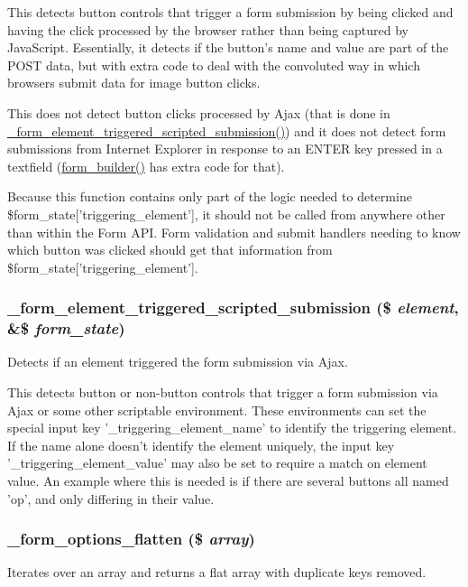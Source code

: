 This detects button controls that trigger a form submission by being clicked and having the click processed by the browser rather than being captured by JavaScript. Essentially, it detects if the button's name and value are part of the POST data, but with extra code to deal with the convoluted way in which browsers submit data for image button clicks.

This does not detect button clicks processed by Ajax (that is done in \hyperlink{group__form__api_ga8ce84d64b9ae0576619ec4399cee2b35}{\_\-form\_\-element\_\-triggered\_\-scripted\_\-submission()}) and it does not detect form submissions from Internet Explorer in response to an ENTER key pressed in a textfield (\hyperlink{group__form__api_gae839323ba1c81ba86030b496fee24f7d}{form\_\-builder()} has extra code for that).

Because this function contains only part of the logic needed to determine \$form\_\-state\mbox{[}'triggering\_\-element'\mbox{]}, it should not be called from anywhere other than within the Form API. Form validation and submit handlers needing to know which button was clicked should get that information from \$form\_\-state\mbox{[}'triggering\_\-element'\mbox{]}. \hypertarget{group__form__api_ga8ce84d64b9ae0576619ec4399cee2b35}{
\subsubsection[{\_\-form\_\-element\_\-triggered\_\-scripted\_\-submission}]{\setlength{\rightskip}{0pt plus 5cm}\_\-form\_\-element\_\-triggered\_\-scripted\_\-submission (\$ {\em element}, \/  \&\$ {\em form\_\-state})}}
\label{group__form__api_ga8ce84d64b9ae0576619ec4399cee2b35}
Detects if an element triggered the form submission via Ajax.

This detects button or non-\/button controls that trigger a form submission via Ajax or some other scriptable environment. These environments can set the special input key '\_\-triggering\_\-element\_\-name' to identify the triggering element. If the name alone doesn't identify the element uniquely, the input key '\_\-triggering\_\-element\_\-value' may also be set to require a match on element value. An example where this is needed is if there are several buttons all named 'op', and only differing in their value. \hypertarget{group__form__api_gabd44cc736d333ca82ef8c6d1dba2dc96}{
\subsubsection[{\_\-form\_\-options\_\-flatten}]{\setlength{\rightskip}{0pt plus 5cm}\_\-form\_\-options\_\-flatten (\$ {\em array})}}
\label{group__form__api_gabd44cc736d333ca82ef8c6d1dba2dc96}
Iterates over an array and returns a flat array with duplicate keys removed.


